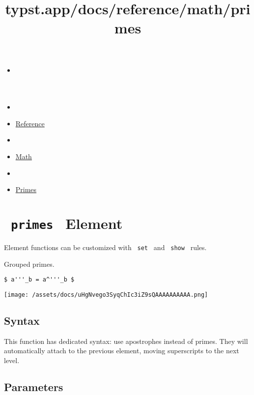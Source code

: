 \title{typst.app/docs/reference/math/primes}

\begin{itemize}
\tightlist
\item
  \href{/docs}{}
\item
  
\item
  \href{/docs/reference/}{Reference}
\item
  
\item
  \href{/docs/reference/math/}{Math}
\item
  
\item
  \href{/docs/reference/math/primes/}{Primes}
\end{itemize}

\section{\texorpdfstring{\texttt{\ primes\ } {{ Element
}}}{ primes   Element }}\label{summary}

\label{element-tooltip}
Element functions can be customized with \texttt{\ set\ } and
\texttt{\ show\ } rules.

Grouped primes.

\begin{verbatim}
$ a'''_b = a^'''_b $
\end{verbatim}

\texttt{[image: /assets/docs/uHgNvego3SyqChIc3iZ9sQAAAAAAAAAA.png]}

\subsection{Syntax}\label{syntax}

This function has dedicated syntax: use apostrophes instead of primes.
They will automatically attach to the previous element, moving
superscripts to the next level.

\subsection{\texorpdfstring{{ Parameters
}}{ Parameters }}\label{parameters}

